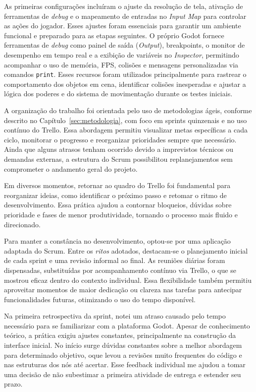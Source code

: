 As primeiras configurações incluíram o ajuste da resolução de tela, ativação de ferramentas de \textit{debug} e o mapeamento de entradas no \textit{Input Map} para controlar as ações do jogador. Esses ajustes foram essenciais para garantir um ambiente funcional e preparado para as etapas seguintes. O próprio Godot fornece ferramentas de \textit{debug} como painel de saída (\textit{Output}), breakpoints, o monitor de desempenho em tempo real e a exibição de variáveis no \textit{Inspector}, permitindo acompanhar o uso de memória, FPS, colisões e mensagens personalizadas via comandos \texttt{print}. Esses recursos foram utilizados principalmente para rastrear o comportamento dos objetos em cena, identificar colisões inesperadas e ajustar a lógica dos poderes e do sistema de movimentação durante os testes iniciais.

A organização do trabalho foi orientada pelo uso de metodologias ágeis, conforme descrito no Capítulo~\ref{sec:metodologia}, com foco em sprints quinzenais e no uso contínuo do Trello. Essa abordagem permitiu visualizar metas específicas a cada ciclo, monitorar o progresso e reorganizar prioridades sempre que necessário. Ainda que alguns atrasos tenham ocorrido devido a imprevistos técnicos ou demandas externas, a estrutura do Scrum possibilitou replanejamentos sem comprometer o andamento geral do projeto.

Em diversos momentos, retornar ao quadro do Trello foi fundamental para reorganizar ideias, como identificar o próximo passo e retomar o ritmo de desenvolvimento. Essa prática ajudou a contornar bloqueios, dúvidas sobre prioridade e fases de menor produtividade, tornando o processo mais fluido e direcionado.

Para manter a constância no desenvolvimento, optou-se por uma aplicação adaptada do Scrum. Entre os \textit{ritos} adotados, destacam-se o planejamento inicial de cada sprint e uma revisão informal ao final. As reuniões diárias foram dispensadas, substituídas por acompanhamento contínuo via Trello, o que se mostrou eficaz dentro do contexto individual. Essa flexibilidade também permitiu aproveitar momentos de maior dedicação ou clareza nas tarefas para antecipar funcionalidades futuras, otimizando o uso do tempo disponível.

Na primeira retrospectiva da sprint, notei um atraso causado pelo tempo necessário para se familiarizar com a plataforma Godot. Apesar de conhecimento teórico, a prática exigiu ajustes constantes, principalmente na construção da interface inicial. No início surge dúvidas constantes sobre a melhor abordagem para determinado objetivo, oque levou a revisões muito frequentes do código e nas estruturas dos nós até acertar. Esse feedback individual me ajudou a tomar uma decisão de não subestimar a primeira atividade de entrega e estender seu prazo.

